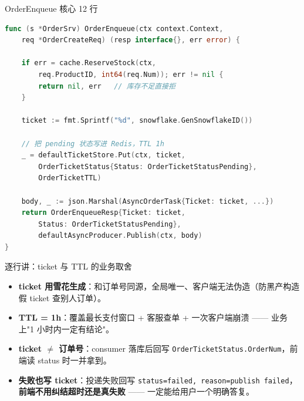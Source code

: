 \documentclass[aspectratio=169,11pt]{beamer}
\begin{document}
\begin{frame}{OrderEnqueue 核心 12 行}
\begin{lstlisting}[language=Go,firstnumber=118,
  caption={}]
func (s *OrderSrv) OrderEnqueue(ctx context.Context,
    req *OrderCreateReq) (resp interface{}, err error) {

    if err = cache.ReserveStock(ctx,
        req.ProductID, int64(req.Num)); err != nil {
        return nil, err   // 库存不足直接拒
    }

    ticket := fmt.Sprintf("%d", snowflake.GenSnowflakeID())

    // 把 pending 状态写进 Redis，TTL 1h
    _ = defaultTicketStore.Put(ctx, ticket,
        OrderTicketStatus{Status: OrderTicketStatusPending},
        OrderTicketTTL)

    body, _ := json.Marshal(AsyncOrderTask{Ticket: ticket, ...})
    return OrderEnqueueResp{Ticket: ticket,
        Status: OrderTicketStatusPending},
        defaultAsyncProducer.Publish(ctx, body)
}
\end{lstlisting}
\end{frame}

\begin{frame}[shrink]{逐行讲：ticket 与 TTL 的业务取舍}
\begin{itemize}
  \item \textbf{ticket 用雪花生成}：和订单号同源，全局唯一、客户端无法伪造（防黑产构造假 ticket 查别人订单）。
  \item \textbf{TTL = 1h}：覆盖最长支付窗口 + 客服查单 + 一次客户端崩溃 —— 业务上"1 小时内一定有结论"。
  \item \textbf{ticket $\ne$ 订单号}：consumer 落库后回写 \texttt{OrderTicketStatus.OrderNum}，前端读 status 时一并拿到。
  \item \textbf{失败也写 ticket}：投递失败回写 \texttt{status=failed, reason=publish failed}，\textbf{前端不用纠结超时还是真失败} —— 一定能给用户一个明确答复。
\end{itemize}
\end{frame}
\end{document}
